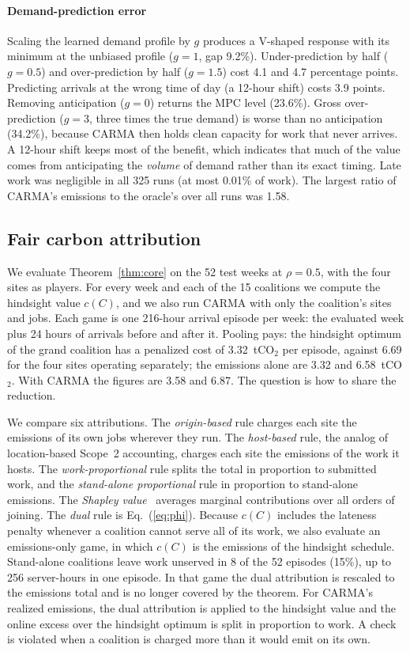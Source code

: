 \paragraph{Demand-prediction error} Scaling the learned demand profile by $g$ produces a V-shaped response with its minimum at the unbiased profile ($g=1$, gap 9.2\%). Under-prediction by half ($g=0.5$) and over-prediction by half ($g=1.5$) cost 4.1 and 4.7 percentage points. Predicting arrivals at the wrong time of day (a 12-hour shift) costs 3.9 points. Removing anticipation ($g=0$) returns the MPC level (23.6\%). Gross over-prediction ($g=3$, three times the true demand) is worse than no anticipation (34.2\%), because CARMA then holds clean capacity for work that never arrives. A 12-hour shift keeps most of the benefit, which indicates that much of the value comes from anticipating the \emph{volume} of demand rather than its exact timing. Late work was negligible in all 325 runs (at most 0.01\% of work). The largest ratio of CARMA's emissions to the oracle's over all runs was 1.58.

\FloatBarrier
\subsection{Fair carbon attribution}\label{sec:res_fair}

We evaluate Theorem~\ref{thm:core} on the 52 test weeks at $\rho=0.5$, with the four sites as players. For every week and each of the 15 coalitions we compute the hindsight value $c(C)$, and we also run CARMA with only the coalition's sites and jobs. Each game is one 216-hour arrival episode per week: the evaluated week plus 24 hours of arrivals before and after it. Pooling pays: the hindsight optimum of the grand coalition has a penalized cost of 3.32~tCO$_2$ per episode, against 6.69 for the four sites operating separately; the emissions alone are 3.32 and 6.58~tCO$_2$. With CARMA the figures are 3.58 and 6.87. The question is how to share the reduction.

We compare six attributions. The \emph{origin-based} rule charges each site the emissions of its own jobs wherever they run. The \emph{host-based} rule, the analog of location-based Scope~2 accounting, charges each site the emissions of the work it hosts. The \emph{work-proportional} rule splits the total in proportion to submitted work, and the \emph{stand-alone proportional} rule in proportion to stand-alone emissions. The \emph{Shapley value}~\cite{shapley1953value} averages marginal contributions over all orders of joining. The \emph{dual} rule is Eq.~(\ref{eq:phi}). Because $c(C)$ includes the lateness penalty whenever a coalition cannot serve all of its work, we also evaluate an emissions-only game, in which $c(C)$ is the emissions of the hindsight schedule. Stand-alone coalitions leave work unserved in 8 of the 52 episodes (15\%), up to 256 server-hours in one episode. In that game the dual attribution is rescaled to the emissions total and is no longer covered by the theorem. For CARMA's realized emissions, the dual attribution is applied to the hindsight value and the online excess over the hindsight optimum is split in proportion to work. A check is violated when a coalition is charged more than it would emit on its own.

